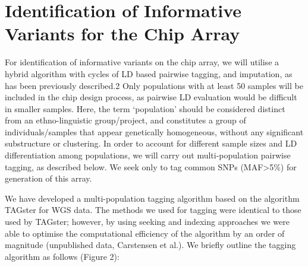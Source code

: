\section{Identification of Informative Variants for the Chip Array}

For identification of informative variants on the chip array, we will utilise a hybrid algorithm with cycles of LD based pairwise tagging, and imputation, as has been previously described.2 Only populations with at least 50 samples will be included in the chip design process, as pairwise LD evaluation would be difficult in smaller samples. Here, the term ‘population’ should be considered distinct from an ethno-linguistic group/project, and constitutes a group of individuals/samples that appear genetically homogeneous, without any significant substructure or clustering. In order to account for different sample sizes and LD differentiation among populations, we will carry out multi-population pairwise tagging, as described below. We seek only to tag common SNPs (MAF\textgreater5\%) for generation of this array.

We have developed a multi-population tagging algorithm based on the algorithm TAGster for WGS data.\cite{Xu2007} The methods we used for tagging were identical to those used by TAGster; however, by using seeking and indexing approaches we were able to optimise the computational efficiency of the algorithm by an order of magnitude (unpublished data, Carstensen et al.). We briefly outline the tagging algorithm as follows (Figure 2):


